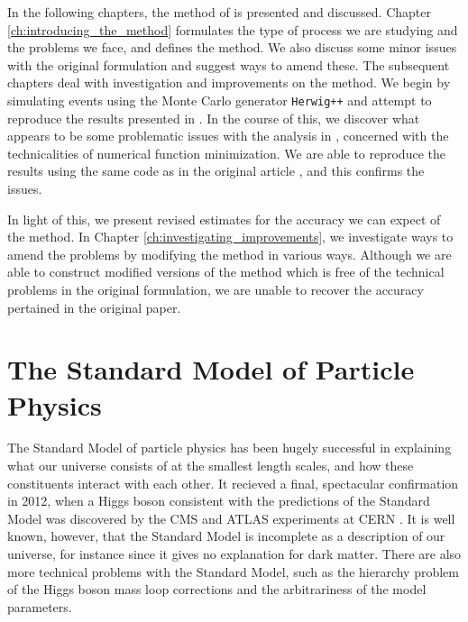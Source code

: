 \documentclass[twoside,english]{uiofysmaster}
\begin{document}
In the following chapters, the method of \cite{Webber:2009vm} is presented and discussed. Chapter \ref{ch:introducing_the_method} formulates the type of process we are studying and the problems we face, and defines the method. We also discuss some minor issues with the original formulation and suggest ways to amend these. The subsequent chapters deal with investigation and improvements on the method. We begin by simulating events using the Monte Carlo generator {\tt Herwig++} and attempt to reproduce the results presented in \cite{Webber:2009vm}. In the course of this, we discover what appears to be some problematic issues with the analysis in \cite{Webber:2009vm}, concerned with the technicalities of numerical function minimization. We are able to reproduce the results using the same code as in the original article \cite{Webber:epost}, and this confirms the issues.

In light of this, we present revised estimates for the accuracy we can expect of the method. In Chapter \ref{ch:investigating_improvements}, we investigate ways to amend the problems by modifying the method in various ways. Although we are able to construct modified versions of the method which is free of the technical problems in the original formulation, we are unable to recover the accuracy pertained in the original paper.


% 
\chapter{The Standard Model of Particle Physics}%
\label{ch:SM_intro}
The Standard Model of particle physics has been hugely successful in explaining what our universe consists of at the smallest length scales, and how these constituents interact with each other. It recieved a final, spectacular confirmation in 2012, when a Higgs boson consistent with the predictions of the Standard Model was discovered by the CMS and ATLAS experiments at CERN \cite{Aad:2012tfa, Chatrchyan:2012ufa}. It is well known, however, that the Standard Model is incomplete as a description of our universe, for instance since it gives no explanation for dark matter. There are also more technical problems with the Standard Model, such as the hierarchy problem of the Higgs boson mass loop corrections and the arbitrariness of the model parameters.
\end{document}
